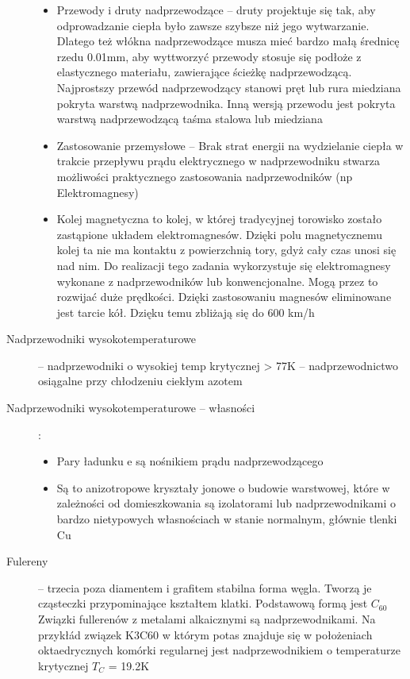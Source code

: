 \documentclass[a4paper,11pt]{article}
\begin{document}
\begin{description}
\begin{itemize}
  \item Przewody i druty nadprzewodzące -- druty projektuje się tak, aby odprowadzanie ciepła było zawsze szybsze niż jego wytwarzanie. Dlatego też włókna nadprzewodzące musza mieć bardzo małą średnicę rzedu 0.01mm, aby wyttworzyć przewody stosuje się podłoże z elastycznego materiału, zawierające ścieżkę nadprzewodzącą. Najprostszy przewód nadprzewodzący stanowi pręt lub rura miedziana pokryta warstwą nadprzewodnika. Inną wersją przewodu jest pokryta warstwą nadprzewodzącą taśma stalowa lub miedziana
  \item Zastosowanie przemysłowe -- Brak strat energii na wydzielanie ciepła w trakcie przepływu prądu elektrycznego w nadprzewodniku stwarza możliwości praktycznego zastosowania nadprzewodników (np Elektromagnesy)
  \item Kolej magnetyczna to kolej, w której tradycyjnej torowisko zostało zastąpione układem elektromagnesów. Dzięki polu magnetycznemu kolej ta nie ma kontaktu z powierzchnią tory, gdyż cały czas unosi się nad nim. Do realizacji tego zadania wykorzystuje się elektromagnesy wykonane z nadprzewodników lub konwencjonalne. Mogą przez to rozwijać duże prędkości. Dzięki zastosowaniu magnesów eliminowane jest tarcie kół. Dzięku temu zbliżają się do 600 km/h
  \end{itemize}
\item[Nadprzewodniki wysokotemperaturowe] -- nadprzewodniki o wysokiej temp krytycznej > 77K -- nadprzewodnictwo osiągalne przy chłodzeniu ciekłym azotem
\item[Nadprzewodniki wysokotemperaturowe -- własności]:
  \begin{itemize}
  \item Pary ładunku e są nośnikiem prądu nadprzewodzącego
  \item Są to anizotropowe kryształy jonowe o budowie warstwowej, które w zależności od domieszkowania są izolatorami lub nadprzewodnikami o bardzo nietypowych własnościach w stanie normalnym, głównie tlenki Cu
  \end{itemize}
\item[Fulereny] -- trzecia poza diamentem i grafitem stabilna forma węgla. Tworzą je cząsteczki przypominające kształtem klatki. Podstawową formą jest $C_{60}$\\
  Związki fullerenów z metalami alkaicznymi są nadprzewodnikami. Na przykłád związek K3C60 w którym potas znajduje się w położeniach oktaedrycznych  komórki regularnej jest nadprzewodnikiem o temperaturze krytycznej $T_C$ = 19.2K
  \begin{itemize}

\end{itemize}
\end{description}
\end{document}
